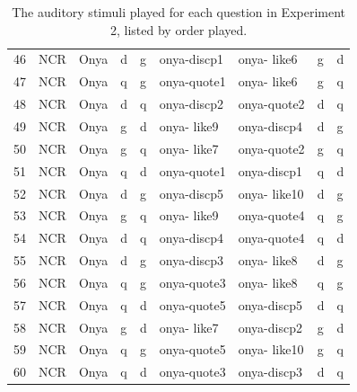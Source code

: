 \begin{table}[htbp]
\begin{center}
{\begin{tabular}{lllllllll}
46	& NCR	& Onya	& d	& g	& onya-discp1	& onya- like6	& g	& d \\
47	& NCR	& Onya	& q	& g	& onya-quote1	& onya- like6	& g	& q \\
48	& NCR	& Onya	& d	& q	& onya-discp2	& onya-quote2	& d	& q \\
49	& NCR	& Onya	& g	& d	& onya- like9	& onya-discp4	& d	& g \\
50	& NCR	& Onya	& g	& q	& onya- like7	& onya-quote2	& g	& q \\
51	& NCR	& Onya	& q	& d	& onya-quote1	& onya-discp1	& q	& d \\
52	& NCR	& Onya	& d	& g	& onya-discp5	& onya- like10	& d	& g \\
53	& NCR	& Onya	& g	& q	& onya- like9	& onya-quote4	& q	& g \\
54	& NCR	& Onya	& d	& q	& onya-discp4	& onya-quote4	& q	& d \\
55	& NCR	& Onya	& d	& g	& onya-discp3	& onya- like8	& d	& g \\
56	& NCR	& Onya	& q	& g	& onya-quote3	& onya- like8	& q	& g \\
57	& NCR	& Onya	& q	& d	& onya-quote5 &	onya-discp5	& d	& q \\
58	& NCR	& Onya	& g	& d	& onya- like7	& onya-discp2	& g	& d \\
59	& NCR	& Onya	& q	& g	& onya-quote5	& onya- like10	& g	& q \\
60	& NCR	& Onya	& q	& d	& onya-quote3	& onya-discp3	& d	& q \\

   \hline
   
	\end{tabular}
}
	\caption{The auditory stimuli played for each question in Experiment 2, listed by order played.}\label{tab:appenExp2stimuli}
	\end{center}
\end{table}	





